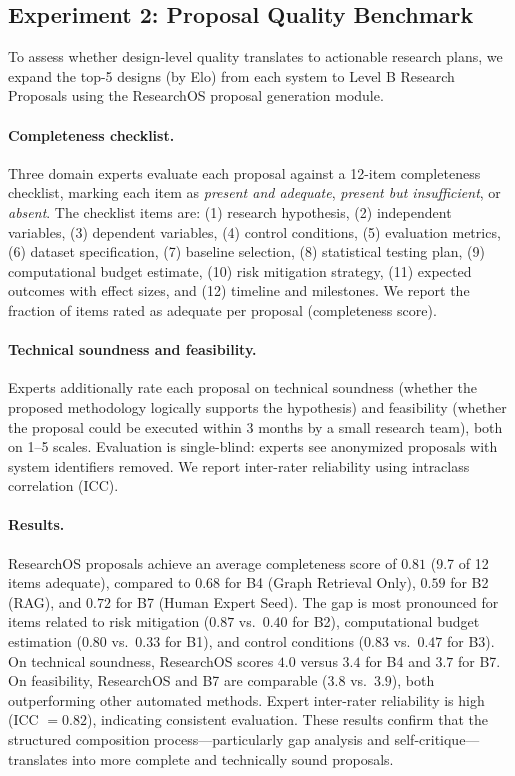 \subsection{Experiment 2: Proposal Quality Benchmark}
\label{subsec:proposal_quality}

To assess whether design-level quality translates to actionable research plans, we expand the top-5 designs (by Elo) from each system to Level B Research Proposals using the ResearchOS proposal generation module.

\paragraph{Completeness checklist.}
Three domain experts evaluate each proposal against a 12-item completeness checklist, marking each item as \emph{present and adequate}, \emph{present but insufficient}, or \emph{absent}. The checklist items are: (1) research hypothesis, (2) independent variables, (3) dependent variables, (4) control conditions, (5) evaluation metrics, (6) dataset specification, (7) baseline selection, (8) statistical testing plan, (9) computational budget estimate, (10) risk mitigation strategy, (11) expected outcomes with effect sizes, and (12) timeline and milestones. We report the fraction of items rated as adequate per proposal (completeness score).

\paragraph{Technical soundness and feasibility.}
Experts additionally rate each proposal on technical soundness (whether the proposed methodology logically supports the hypothesis) and feasibility (whether the proposal could be executed within 3 months by a small research team), both on 1--5 scales. Evaluation is single-blind: experts see anonymized proposals with system identifiers removed. We report inter-rater reliability using intraclass correlation (ICC).

\paragraph{Results.}
ResearchOS proposals achieve an average completeness score of $0.81$ (9.7 of 12 items adequate), compared to $0.68$ for B4 (Graph Retrieval Only), $0.59$ for B2 (RAG), and $0.72$ for B7 (Human Expert Seed). The gap is most pronounced for items related to risk mitigation ($0.87$ vs.\ $0.40$ for B2), computational budget estimation ($0.80$ vs.\ $0.33$ for B1), and control conditions ($0.83$ vs.\ $0.47$ for B3). On technical soundness, ResearchOS scores $4.0$ versus $3.4$ for B4 and $3.7$ for B7. On feasibility, ResearchOS and B7 are comparable ($3.8$ vs.\ $3.9$), both outperforming other automated methods. Expert inter-rater reliability is high (ICC $= 0.82$), indicating consistent evaluation. These results confirm that the structured composition process---particularly gap analysis and self-critique---translates into more complete and technically sound proposals.


